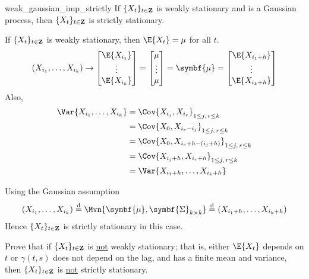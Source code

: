 \begin{Theorem}{}{weak_gaussian_imp_strictly}
    If $ \{X_t\}_{t\in\mathbf{Z}} $ is weakly stationary and is a Gaussian process, then
    $ \{X_t\}_{t\in\mathbf{Z}} $ is strictly stationary.
\end{Theorem}
\begin{Proof}{}{}
    If $ \{X_t\}_{t\in\mathbf{Z}} $ is weakly stationary, then $ \E{X_t}=\mu $ for all $ t $.
    \[ (X_{i_1},\ldots,X_{i_k})\rightarrow
        \begin{bmatrix}
            \E{X_{i_1}} \\
            \vdots      \\
            \E{X_{i_k}}
        \end{bmatrix}=\begin{bmatrix}
            \mu    \\
            \vdots \\
            \mu
        \end{bmatrix}=\symbf{\mu}=
        \begin{bmatrix}
            \E{X_{{i_1}+h}} \\
            \vdots          \\
            \E{X_{{i_k}+h}}
        \end{bmatrix} \]
    Also,
    \begin{align*}
        \Var{X_{i_1},\ldots,X_{i_k}}
         & =\Cov{X_{i_j},X_{i_r}}_{1\le j,\, r\le k}       \\
         & =\Cov{X_0,X_{i_r-i_j}}_{1\le j,\, r\le k}       \\
         & =\Cov{X_0,X_{i_r+h-(i_j+h)}}_{1\le j,\, r\le k} \\
         & =\Cov{X_{i_j+h},X_{i_r+h}}_{1\le j,\, r\le k}   \\
         & =\Var{X_{i_1+h},\ldots,X_{i_k+h}}
    \end{align*}
\end{Proof}
\begin{Example}{}{}
    Using the Gaussian assumption
    \[ (X_{i_1},\ldots,X_{i_k})
        \stackrel{\text{d}}{=}\Mvn{\symbf{\mu},\symbf{\Sigma}_{k\times k}}
        \stackrel{\text{d}}{=}(X_{i_1+h},\ldots,X_{i_k+h}) \]
    Hence $ \{X_{t}\}_{t\in\mathbf{Z}} $ is strictly stationary
    in this case.
\end{Example}
\begin{Exercise}{}{}
    Prove that if $ \{X_t\}_{t\in\mathbf{Z}} $ is \underline{not}
    weakly stationary; that is, either $ \E{X_t} $ depends on $ t $
    or $ \gamma(t,s) $ does not depend on the lag, and has
    a finite mean and variance,
    then $ \{X_t\}_{t\in\mathbf{Z}} $ is \underline{not} strictly stationary.
\end{Exercise}

